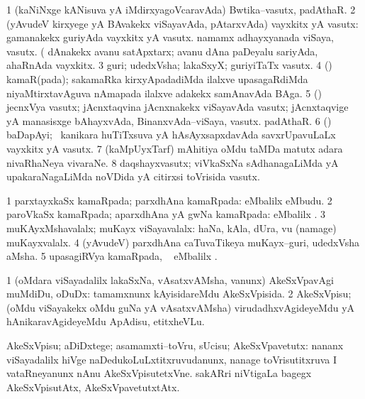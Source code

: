 \bentry
{}
\gl{\nA}
\bmng
\bnum
\num{1} (kaNiNxge kANisuva yA iMdirxyagoVcaravAda) Bwtika--vasutx, padAthaR. 
\num{2} (yAvudeV kirxyege yA BAvakekx viSayavAda, pAtarxvAda) vayxkitx yA vasutx:  gamanakekx guriyAda vayxkitx yA vasutx.  namamx adhayxyanada viSaya, vasutx.  (  dAnakekx avanu satApxtarx; avanu dAna paDeyalu sariyAda, ahaRnAda vayxkitx. 
\num{3} guri; udedxVsha; lakaSxyX; guriyiTaTx vasutx. 
\num{4} (\vAyx) kamaR(pada); sakamaRka kirxyApadadiMda ilalxve upasagaRdiMda niyaMtirxtavAguva nAmapada ilalxve adakekx samAnavAda BAga. 
\num{5} (\tashA) jecnxVya vasutx; jAcnxtaqvina jAcnxnakekx viSayavAda vasutx; jAcnxtaqvige yA manasisxge bAhayxvAda, BinanxvAda--viSaya, vasutx. padAthaR. 
\num{6} (\hiV) baDapAyi; \kanmu\ kanikara huTiTxsuva yA hAsAyxsapxdavAda savxrUpavuLaLx vayxkitx yA vasutx. 
\num{7} (kaMpUyxTarf) mAhitiya oMdu taMDa matutx adara nivaRhaNeya vivaraNe. 
\num{8} daqshayxvasutx; viVkaSxNa sAdhanagaLiMda yA upakaraNagaLiMda noVDida yA citirxsi toVrisida vasutx. 
\enum
\emng

\noindent
\gl{\pagu}
\bmng
\bnum
\num{1}  parxtayxkaSx kamaRpada; parxdhAna kamaRpada:  eMbalilx  eMbudu. 
\num{2}  paroVkaSx kamaRpada; aparxdhAna yA gwNa kamaRpada:  eMbalilx . 
\num{3}  muKAyxMshavalalx; muKayx viSayavalalx:  haNa, kAla, dUra, \mo vu (namage) muKayxvalalx. 
\num{4}  (yAvudeV) parxdhAna caTuvaTikeya muKayx--guri, udedxVsha aMsha. 
\num{5}  upasagiRVya kamaRpada, \udA\  eMbalilx . 
\enum
\emng
\eentry

\bentry
{}
\gl{\sakirx}
\bmng
\bnum
\num{1} (oMdara viSayadalilx lakaSxNa, vAsatxvAMsha, \mo vanunx) AkeSxVpavAgi muMdiDu, oDuDx:  tamamxnunx kAyisidareMdu AkeSxVpisida. 
\num{2} AkeSxVpisu; (oMdu viSayakekx oMdu guNa yA vAsatxvAMsha) virudadhxvAgideyeMdu yA hAnikaravAgideyeMdu ApAdisu, etitxheVLu. 
\enum
\emng

\noindent
\gl{\akirx}
\bmng
AkeSxVpisu; aDiDxtege; asamamxti--toVru, sUcisu; AkeSxVpavetutx:  nananx viSayadalilx hiVge naDedukoLuLxtitxruvudanunx, nanage toVrisutitxruva I vataRneyanunx nAnu AkeSxVpisutetxVne.  sakARri niVtigaLa bagegx AkeSxVpisutAtx, AkeSxVpavetutxtAtx. 
\emng

